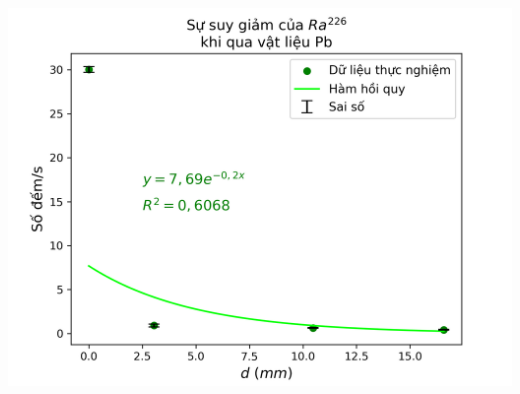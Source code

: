 \documentclass{article}
\begin{document}
\begin{center}
  {\includegraphics[width=\textwidth]{pb}}
\end{center}

\newpage
\clearpage\thispagestyle{empty}\addtocounter{page}{-1} 
\clearpage
\mbox{}
\newpage
\end{document}
